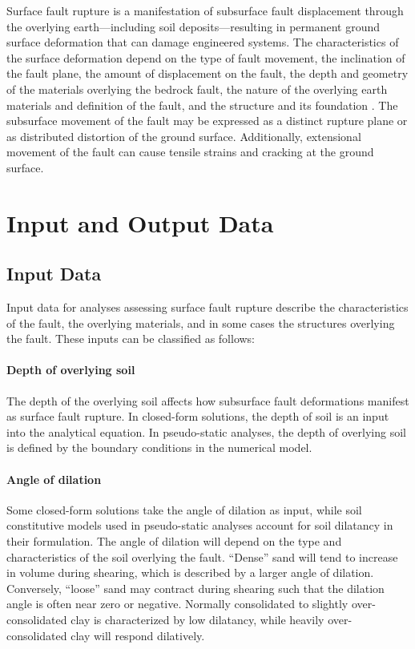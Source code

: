 Surface fault rupture is a manifestation of subsurface fault displacement through the overlying earth---including soil deposits---resulting in permanent ground surface deformation that can damage engineered systems. The characteristics of the surface deformation depend on the type of fault movement, the inclination of the fault plane, the amount of displacement on the fault, the depth and geometry of the materials overlying the bedrock fault, the nature of the overlying earth materials and definition of the fault, and the structure and its foundation \citep{bray2001developing}. The subsurface movement of the fault may be expressed as a distinct rupture plane or as distributed distortion of the ground surface. Additionally, extensional movement of the fault can cause tensile strains and cracking at the ground surface.

\section{Input and Output Data}
\label{sec:eq_surface_rup_input_output}

\subsection{Input Data}

Input data for analyses assessing surface fault rupture describe the characteristics of the fault, the overlying materials, and in some cases the structures overlying the fault. These inputs can be classified as follows:

\paragraph{Depth of overlying soil}
The depth of the overlying soil affects how subsurface fault deformations manifest as surface fault rupture. In closed-form solutions, the depth of soil is an input into the analytical equation. In pseudo-static analyses, the depth of overlying soil is defined by the boundary conditions in the numerical model.

\paragraph{Angle of dilation}
Some closed-form solutions take the angle of dilation as input, while soil constitutive models used in pseudo-static analyses account for soil dilatancy in their formulation. The angle of dilation will depend on the type and characteristics of the soil overlying the fault. ``Dense'' sand will tend to increase in volume during shearing, which is described by a larger angle of dilation. Conversely, ``loose'' sand may contract during shearing such that the dilation angle is often near zero or negative. Normally consolidated to slightly over-consolidated clay is characterized by low dilatancy, while heavily over-consolidated clay will respond dilatively.

